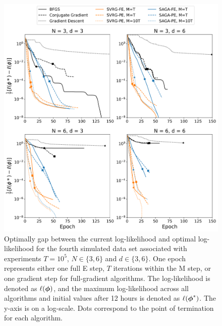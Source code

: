 \documentclass[12pt]{article}
\begin{document}
\begin{figure}[H]
    \centering
    \includegraphics[width=6.5in]{../plt/log-like_v_epoch_T-100000-003.png}
    \caption{Optimally gap between the current log-likelihood and optimal log-likelihood for the fourth simulated data set associated with experiments $T=10^{5}$, $N \in \{3,6\}$ and $d \in \{3,6\}$. One epoch represents either one full E step, $T$ iterations within the M step, or one gradient step for full-gradient algorithms. The log-likelihood is denoted as $\ell(\boldsymbol{\phi})$, and the maximum log-likelihood across all algorithms and initial values after 12 hours is denoted as $\ell(\boldsymbol{\phi}^*)$. The y-axis is on a log-scale. Dots correspond to the point of termination for each algorithm.}
\end{figure}
%
\end{document}
